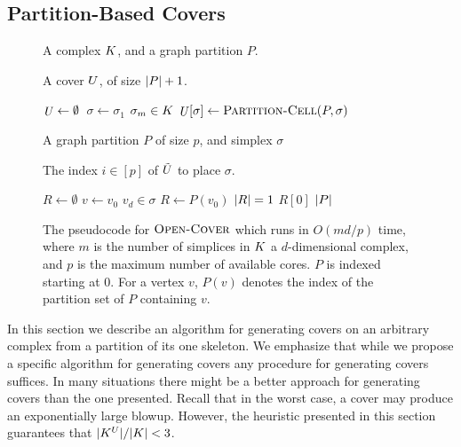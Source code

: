 \subsection{Partition-Based Covers}

\label{sec:partition-based-covers}
\label{sec:pcover}
\begin{figure}[h!]
\centering
\begin{minipage}[b]{.45\textwidth}
\begin{description}
\addtolength{\itemsep}{-.65\baselineskip}
\item[\small\textbf{Input:}] \small A complex $K$, and a graph partition $P$.
\item[\small\textbf{Output:}] \small A cover $U$, of size $|P|+1$.
\end{description}
\begin{codebox}
 \li	$\id{\C} \gets \emptyset$
 \li  \Parfor\,$ \sigma \gets \sigma_1$ \To $\sigma_m \in K$
 \li 	   \Do  $\id{\C}[\sigma] \gets \proc{Partition-Cell}(P,\sigma)$
          \End
 \li \Return \id{\C}
  \End
\end{codebox}
\end{minipage}
\begin{minipage}[b]{.45\textwidth}
\begin{description}
\addtolength{\itemsep}{-.65\baselineskip}
\item[\small \textbf{Input:}] \small A graph partition $P$ of size $p$, and simplex $\sigma$
\item[\small \textbf{Output:}] \small The index $i \in [p]$ of  $\tilde{U}$ to place $\sigma$.
\end{description}
\begin{codebox}
 \li	$R \gets \emptyset$
 \li  \For $v \gets v_0$ \To $v_d \in \sigma$
 \li 	   \Do $R \gets P(v_0)$
          \End
 \li	\If $|R| = 1$ \Return $R[0]$
 \li    \Else \Return $|P|$
\end{codebox}
\end{minipage}
\caption{The pseudocode for $\textnormal{\scshape Open-Cover}$ which runs in $O(md/p)$ time, where $m$ is the 
number of simplices in $K$ a $d$-dimensional complex, and $p$ is the 
maximum number of available cores. $P$ is indexed starting at 0. For a vertex $v$, $P(v)$ 
denotes the index of the partition set of $P$ containing $v$.
}
\label{alg:open-cov}
\end{figure}
In this section we describe an algorithm for generating covers on an 
arbitrary complex from a partition of its one skeleton. We emphasize that while we propose a specific
algorithm for generating covers any procedure for generating covers suffices. In many situations there might be a 
better approach for generating covers than the one presented. Recall that in the worst case, a cover may produce an exponentially large blowup. 
However, the heuristic presented in this section guarantees that $|K^{U}|/|K| < 3$. 

